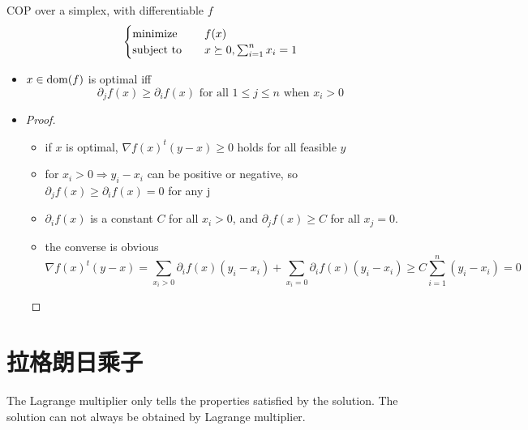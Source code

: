 \begin{remark}
    COP over a simplex, with differentiable $f$
    \[\begin{cases}
        \operatorname{minimize} \quad &f(x)\\
        \operatorname{subject\ to} \quad &x \succeq 0, \sum_{i = 1}^nx_i = 1
    \end{cases}\]
    \begin{itemize}
        \item $x \in \operatorname{dom}(f)$ is optimal iff\[\partial_jf(x) \ge \partial_if(x)\text{ for all } 1 \le j \le n \text{ when } x_i > 0\]
        \item \begin{proof}
            \begin{itemize}
                \item if $x$ is optimal, $\nabla f(x)^t(y - x) \ge 0$ holds for all feasible $y$
                \item for $x_i > 0 \Longrightarrow y_i - x_i$ can be positive or negative, so $\partial_j f(x) \ge \partial_i f(x) = 0$ for any j
                \item $\partial_if(x)$ is a constant $C$ for all $x_i > 0$, and $\partial_jf(x) \ge C$ for all $x_j = 0$.
                \item the converse is obvious\[\nabla f(x)^t(y - x) = \sum_{x_i > 0}\partial_i f(x)(y_i - x_i) + \sum_{x_i = 0}\partial_i f(x)(y_i - x_i) \ge C\sum_{i = 1}^n(y_i - x_i) = 0\]
            \end{itemize}
        \end{proof}
    \end{itemize}
\end{remark}

\section{拉格朗日乘子}
\begin{remark}
    The Lagrange multiplier only tells the properties satisfied by the solution. The solution can not always be obtained by Lagrange multiplier.
\end{remark}

